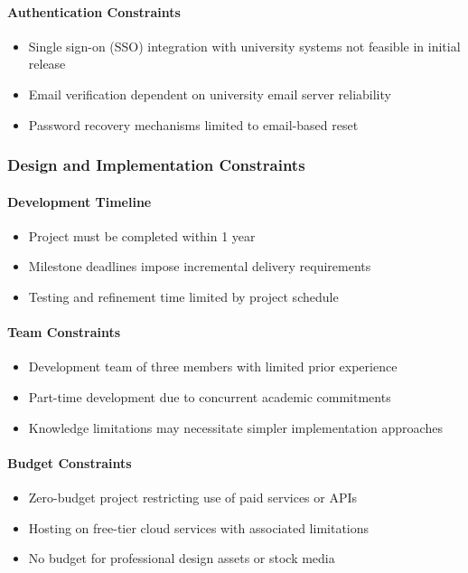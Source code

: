\documentclass[12pt,a4paper]{article}
\begin{document}
\begin{enumerate}
\paragraph{Authentication Constraints}
\begin{itemize}
    \item Single sign-on (SSO) integration with university systems not feasible in initial release
    \item Email verification dependent on university email server reliability
    \item Password recovery mechanisms limited to email-based reset
\end{itemize}

\subsubsection{Design and Implementation Constraints}
\paragraph{Development Timeline}
\begin{itemize}
    \item Project must be completed within 1 year  
    \item Milestone deadlines impose incremental delivery requirements
    \item Testing and refinement time limited by project schedule
\end{itemize}

\paragraph{Team Constraints}
\begin{itemize}
    \item Development team of three members with limited prior experience
    \item Part-time development due to concurrent academic commitments
    \item Knowledge limitations may necessitate simpler implementation approaches
\end{itemize}

\paragraph{Budget Constraints}
\begin{itemize}
    \item Zero-budget project restricting use of paid services or APIs
    \item Hosting on free-tier cloud services with associated limitations
    \item No budget for professional design assets or stock media
\end{itemize}


\end{enumerate}
\end{document}
